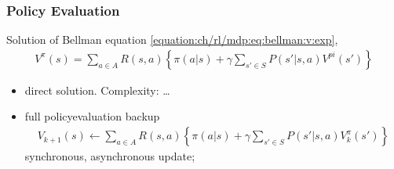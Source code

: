 \documentclass[letterpaper,10pt,english]{jupyterBook}
\begin{document}
\subsubsection{Policy Evaluation}
\label{\detokenize{ch/rl/mdp_sol_dp_lp:policy-evaluation}}\label{\detokenize{ch/rl/mdp_sol_dp_lp:rl-mdp-sol-dp-pi-eval}}
\sphinxAtStartPar
{} Solution of Bellman equation \eqref{equation:ch/rl/mdp:eq:bellman:v:exp},
\begin{equation*}
\begin{split}V^{\pi}(s) = \sum_{a \in A} R(s,a) \left\{  \pi(a|s) + \gamma \sum_{s' \in S} P(s'|s,a) V^{pi}(s') \right\}\end{split}
\end{equation*}\begin{itemize}
\item {} 
\sphinxAtStartPar
direct solution. Complexity: …

\item {} 
\sphinxAtStartPar
full policy\sphinxhyphen{}evaluation back\sphinxhyphen{}up
\begin{equation*}
\begin{split}V_{k+1}(s) \leftarrow \sum_{a \in A} R(s,a) \left\{  \pi(a|s) + \gamma \sum_{s' \in S} P(s'|s,a) V^{\pi}_k(s') \right\}\end{split}
\end{equation*}
\sphinxAtStartPar
synchronous, asynchronous update;  

\end{itemize}
\end{document}
